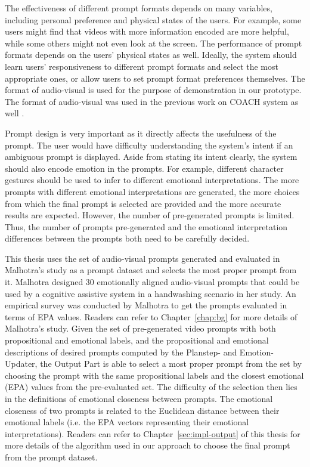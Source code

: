 The effectiveness of different prompt formats depends on many variables, including personal preference and physical states of the users. For example, some users might find that videos with more information encoded are more helpful, while some others might not even look at the screen. The performance of prompt formats depends on the users' physical states as well. Ideally, the system should learn users' responsiveness to different prompt formats and select the most appropriate ones, or allow users to set prompt format preferences themselves. The format of audio-visual is used for the purpose of demonstration in our prototype. The format of audio-visual was used in the previous work on COACH system as well \cite{mihailidis2008coach}.

Prompt design is very important as it directly affects the usefulness of the prompt. The user would have difficulty understanding the system's intent if an ambiguous prompt is displayed. Aside from stating its intent clearly, the system should also encode emotion in the prompts. For example, different character gestures should be used to infer to different emotional interpretations. The more prompts with different emotional interpretations are generated, the more choices from which the final prompt is selected are provided and the more accurate results are expected. However, the number of pre-generated prompts is limited. Thus, the number of prompts pre-generated and the emotional interpretation differences between the prompts both need to be carefully decided. 

This thesis uses the set of audio-visual prompts generated and evaluated in Malhotra's study \cite{malhotra2014} as a prompt dataset and selects the most proper prompt from it. Malhotra designed 30 emotionally aligned audio-visual prompts that could be used by a cognitive assistive system in a handwashing scenario in her study. An empirical survey was conducted by Malhotra to get the prompts evaluated in terms of EPA values. Readers can refer to Chapter~\ref{chap:bg} for more details of Malhotra's study. Given the set of pre-generated video prompts with both propositional and emotional labels, and the propositional and emotional descriptions of desired prompts computed by the Planstep- and Emotion-Updater, the Output Part is able to select a most proper prompt from the set by choosing the prompt with the same propositional labels and the closest emotional (EPA) values from the pre-evaluated set. The difficulty of the selection then lies in the definitions of emotional closeness between prompts. The emotional closeness of two prompts is related to the Euclidean distance between their emotional labels (i.e. the EPA vectors representing their emotional interpretations). Readers can refer to Chapter~\ref{sec:impl-output} of this thesis for more details of the algorithm used in our approach to choose the final prompt from the prompt dataset.

